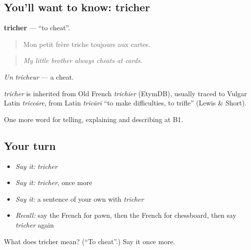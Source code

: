 \subsection*{You'll want to know: tricher}
\textbf{tricher} — \textquotedblleft{}to cheat\textquotedblright{}.

\begin{quote}
Mon petit frère triche toujours aux cartes.
\end{quote}

\begin{quote}
\emph{My little brother always cheats at cards.}
\end{quote}

\emph{Un tricheur} — a cheat.

\begin{cousinweb}
\emph{tricher} is inherited from Old French \emph{trichier} (EtymDB), usually traced to Vulgar Latin \emph{triccāre}, from Latin \emph{trīcārī} \textquotedblleft{}to make difficulties, to trifle\textquotedblright{} (Lewis \& Short).
\end{cousinweb}

\begin{grammarlens}[title={What you've built}]
One more word for telling, explaining and describing at B1.
\end{grammarlens}

\subsection*{Your turn}
\begin{itemize}
\raggedright
  \item \emph{Say it:} \emph{tricher}
  \item \emph{Say it:} \emph{tricher}, once more
  \item \emph{Say it:} a sentence of your own with \emph{tricher}
  \item \emph{Recall:} say the French for pawn, then the French for chessboard, then say \emph{tricher} again
\end{itemize}

\begin{tcolorbox}[breakable,colback=teal!4,colframe=teal!35!black,title={Before you move on}]
What does tricher mean? (\textquotedblleft{}To cheat\textquotedblright{}.) Say it once more.
\end{tcolorbox}
